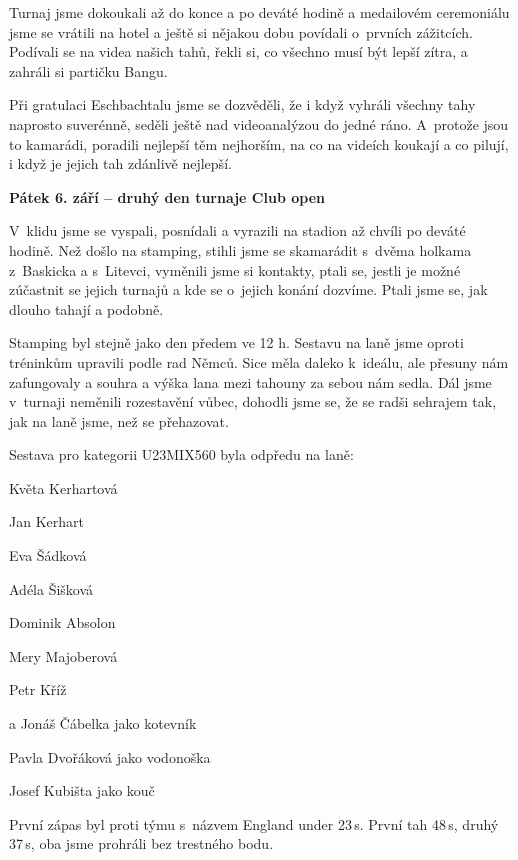 \documentclass[11pt]{article}
\begin{document}
Turnaj jsme dokoukali až do konce a po deváté hodině a medailovém ceremoniálu jsme se vrátili na hotel a ještě si nějakou dobu povídali o~prvních zážitcích. Podívali se na videa našich tahů, řekli si, co všechno musí být lepší zítra, a zahráli si partičku Bangu.

Při gratulaci Eschbachtalu jsme se dozvěděli, že i když vyhráli všechny tahy naprosto suverénně, seděli ještě nad videoanalýzou do jedné ráno. A~protože jsou to kamarádi, poradili nejlepší těm nejhorším, na co na videích koukají a co pilují, i když je jejich tah zdánlivě nejlepší.

\vspace*{12pt}
\noindent\textbf{Pátek 6. září – druhý den turnaje Club open}
\vspace*{6pt}

\noindent
V~klidu jsme se vyspali, posnídali a vyrazili na stadion až chvíli po deváté hodině. Než došlo na stamping, stihli jsme se skamarádit s~dvěma holkama z~Baskicka a s~Litevci, vyměnili jsme si kontakty, ptali se, jestli je možné zúčastnit se jejich turnajů a kde se o~jejich konání dozvíme. Ptali jsme se, jak dlouho tahají a podobně.

Stamping byl stejně jako den předem ve 12 h. Sestavu na laně jsme oproti tréninkům upravili podle rad Němců. Sice měla daleko k~ideálu, ale přesuny nám zafungovaly a souhra a výška lana mezi tahouny za sebou nám sedla. Dál jsme v~turnaji neměnili rozestavění vůbec, dohodli jsme se, že se radši sehrajem tak, jak na laně jsme, než se přehazovat.

Sestava pro kategorii U23MIX560 byla odpředu na laně:

\vspace*{6pt}
Květa Kerhartová

Jan Kerhart

Eva Šádková

Adéla Šišková

Dominik Absolon

Mery Majoberová

Petr Kříž

a Jonáš Čábelka jako kotevník

\vspace*{6pt}

Pavla Dvořáková jako vodonoška

Josef Kubišta jako kouč

\vspace*{6pt}

První zápas byl proti týmu s~názvem England under 23\,s. První tah 48\,s, druhý 37\,s, oba jsme prohráli bez trestného bodu.
\end{document}
